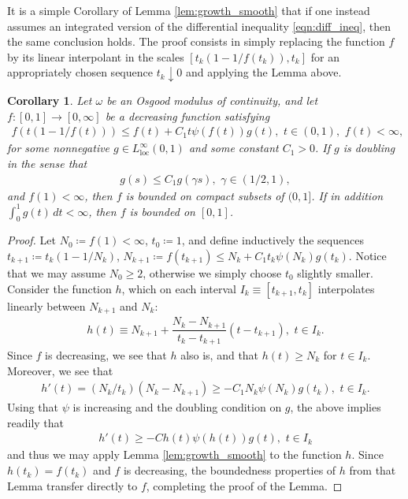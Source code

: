\documentclass[12pt,leqno]{amsart}
\numberwithin{equation}{section}
\newtheorem{cor}[lemma]{Corollary}
\theoremstyle{definition}
\newcommand{\ra}{\rightarrow}
\newcommand{\da}{\downarrow}
\newcommand{\loc}{\mathrm{loc}}
\begin{document}
It is a simple Corollary of Lemma \ref{lem:growth_smooth} that if one instead assumes an integrated version of the differential inequality \eqref{eqn:diff_ineq}, then the same conclusion holds. The proof consists in simply replacing the function $f$ by its linear interpolant in the scales $[t_k(1-1/f(t_k)), t_k]$ for an appropriately chosen sequence $t_k \da 0$ and applying the Lemma above.

 \begin{cor}\label{cor:growth_disc}
 	Let $\omega$ be an Osgood modulus of continuity, and let $f:[0,1] \ra [0, \infty]$ be a decreasing function satisfying
 	\begin{align}\label{eqn:diff_ineq_disc}
 		f \left(  t \left( 1 - 1/f(t)  \right)   \right) \le f(t) + C_1 t \psi(f(t)) g(t), \, \, t \in (0,1), \, \, f (t) < \infty,
 	\end{align}
 	for some nonnegative $g \in L^\infty_{\loc}(0,1)$ and some constant $C_1 > 0$. If $g$ is doubling in the sense that 
 	\begin{align*}
 		g(s) \le C_1 g(\gamma s), \, \, \gamma \in (1/2, 1),
 	\end{align*}
 	and $f(1) < \infty$, then $f$ is bounded on compact subsets of $(0, 1]$. If in addition $\int_0^1 g(t) \, dt < \infty$, then $f$ is bounded on $[0,1]$. 
 \end{cor}
\begin{proof}
	 Let $N_0 \coloneqq f(1) < \infty$, $t_0 \coloneqq 1$, and define inductively the sequences $t_{k+1} \coloneqq t_k(1 - 1/ N_k)$, $N_{k+1} \coloneqq f(t_{k+1}) \le N_k + C_1 t_k \psi(N_k) g(t_k)$. Notice that we may assume $N_0 \ge 2$, otherwise we simply choose $t_0$ slightly smaller. Consider the function $h$, which on each interval $I_k \equiv [t_{k+1}, t_k]$ interpolates linearly between $N_{k+1}$ and $N_k$:
	\begin{align*}
		h(t) \equiv N_{k+1} + \dfrac{N_k - N_{k+1}}{t_k - t_{k+1}} (t - t_{k+1}), \, \, t \in I_k.
	\end{align*}
	Since $f$ is decreasing, we see that $h$ also is, and that $h(t) \ge N_k$ for $t \in I_k$. Moreover, we see that 
	\begin{align*}
		h'(t) = (N_k/t_k) (N_k - N_{k+1}) \ge - C_1 N_k \psi(N_k) g(t_k), \, \, t \in I_k.
	\end{align*}
	Using that $\psi$ is increasing and the doubling condition on $g$, the above implies readily that 
	\begin{align*}
		h'(t) \ge -C h(t) \psi(h(t)) g(t), \, \, t \in I_k
	\end{align*}
	and thus we may apply Lemma \ref{lem:growth_smooth} to the function $h$. Since $h(t_k) = f(t_k)$ and $f$ is decreasing, the boundedness properties of $h$ from that Lemma transfer directly to $f$, completing the proof of the Lemma. 
\end{proof}
\end{document}
